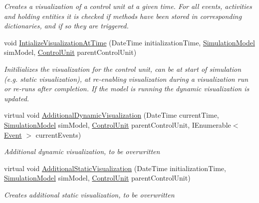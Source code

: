 \begin{DoxyCompactItemize}
\begin{DoxyCompactList}\small\item\em Creates a visualization of a control unit at a given time. For all events, activities and holding entities it is checked if methods have been stored in corresponding dictionaries, and if so they are triggered. \end{DoxyCompactList}\item 
void \hyperlink{class_simulation_w_p_f_visualization_tools_1_1_base_w_p_f_control_unit_visualization_engine_af40267f0db22138cabaf8749995aa139}{Intialize\+Visualization\+At\+Time} (Date\+Time initialization\+Time, \hyperlink{class_simulation_core_1_1_simulation_classes_1_1_simulation_model}{Simulation\+Model} sim\+Model, \hyperlink{class_simulation_core_1_1_h_c_c_m_elements_1_1_control_unit}{Control\+Unit} parent\+Control\+Unit)
\begin{DoxyCompactList}\small\item\em Initilializes the visualization for the control unit, can be at start of simulation (e.\+g. static visualization), at re-\/enabling visualization during a visualization run or re-\/runs after completion. If the model is running the dynamic visualization is updated. \end{DoxyCompactList}\item 
virtual void \hyperlink{class_simulation_w_p_f_visualization_tools_1_1_base_w_p_f_control_unit_visualization_engine_a1e02970346316401bdda88dd388eb83e}{Additional\+Dynamic\+Visualization} (Date\+Time current\+Time, \hyperlink{class_simulation_core_1_1_simulation_classes_1_1_simulation_model}{Simulation\+Model} sim\+Model, \hyperlink{class_simulation_core_1_1_h_c_c_m_elements_1_1_control_unit}{Control\+Unit} parent\+Control\+Unit, I\+Enumerable$<$ \hyperlink{class_simulation_core_1_1_h_c_c_m_elements_1_1_event}{Event} $>$ current\+Events)
\begin{DoxyCompactList}\small\item\em Additional dynamic visualization, to be overwritten \end{DoxyCompactList}\item 
virtual void \hyperlink{class_simulation_w_p_f_visualization_tools_1_1_base_w_p_f_control_unit_visualization_engine_a10a058f9467d07f6fa9e679c6dbb639b}{Additional\+Static\+Visualization} (Date\+Time initialization\+Time, \hyperlink{class_simulation_core_1_1_simulation_classes_1_1_simulation_model}{Simulation\+Model} sim\+Model, \hyperlink{class_simulation_core_1_1_h_c_c_m_elements_1_1_control_unit}{Control\+Unit} parent\+Control\+Unit)
\begin{DoxyCompactList}\small\item\em Creates additional static visualization, to be overwritten \end{DoxyCompactList}\end{DoxyCompactItemize}
